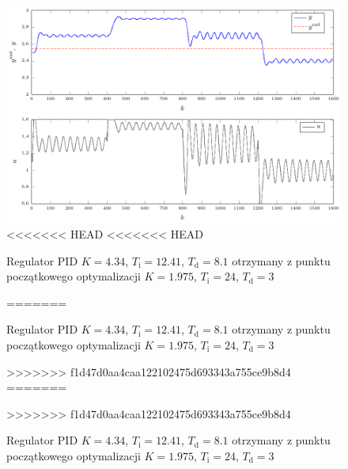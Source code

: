 \begin{figure}[tb] 
\centering 
\includegraphics[scale=1]{rysunki/zapisz_pdf/PID_K=4.340_Ti=12.41_Td=8.10.pdf} 
<<<<<<< HEAD
<<<<<<< HEAD
\caption{Regulator PID $K=\num{4.34}$, $T_{\mathrm{i}}=\num{12.41}$, $T_{\mathrm{d}}=\num{8.1}$ otrzymany z punktu początkowego optymalizacji $K=\num{1.975}$, $T_{\mathrm{i}}=24$, $T_{\mathrm{d}}=3$} 
=======
\caption{Regulator PID $K=\num{4.34}$, $T_{\mathrm{i}}=12.41$, $T_{\mathrm{d}}=8.1$ otrzymany z punktu początkowego optymalizacji $K=\num{1.975}$, $T_{\mathrm{i}}=24$, $T_{\mathrm{d}}=3$} 
>>>>>>> f1d47d0aa4caa122102475d693343a755ce9b8d4
=======
\caption{Regulator PID $K=\num{4.34}$, $T_{\mathrm{i}}=12.41$, $T_{\mathrm{d}}=8.1$ otrzymany z punktu początkowego optymalizacji $K=\num{1.975}$, $T_{\mathrm{i}}=24$, $T_{\mathrm{d}}=3$} 
>>>>>>> f1d47d0aa4caa122102475d693343a755ce9b8d4
\label{r_pgfplots_PID_K=4.340_Ti=12.41_Td=8.10} 
\end{figure}

